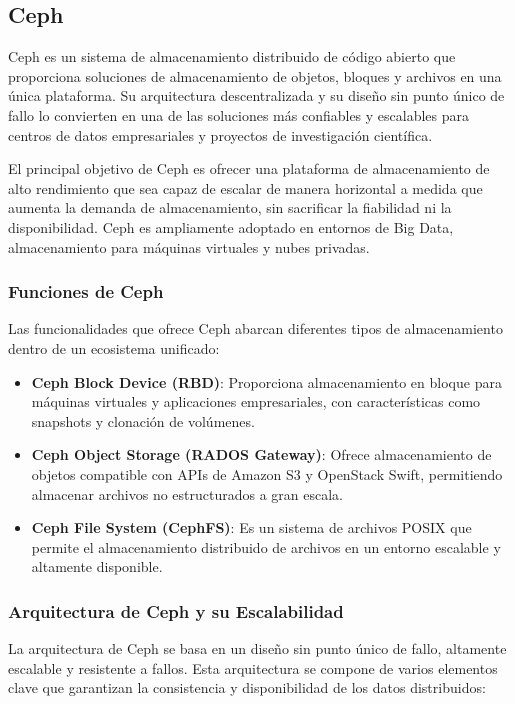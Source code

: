 {        \subsection{Ceph}
            Ceph es un sistema de almacenamiento distribuido de código abierto que proporciona soluciones de almacenamiento de objetos, bloques y archivos en una única plataforma. Su arquitectura descentralizada y su diseño sin punto único de fallo lo convierten en una de las soluciones más confiables y escalables para centros de datos empresariales y proyectos de investigación científica.
            
            El principal objetivo de Ceph es ofrecer una plataforma de almacenamiento de alto rendimiento que sea capaz de escalar de manera horizontal a medida que aumenta la demanda de almacenamiento, sin sacrificar la fiabilidad ni la disponibilidad. Ceph es ampliamente adoptado en entornos de Big Data, almacenamiento para máquinas virtuales y nubes privadas.
            
            \subsubsection{Funciones de Ceph}
                Las funcionalidades que ofrece Ceph abarcan diferentes tipos de almacenamiento dentro de un ecosistema unificado:
                
                \begin{itemize}
                    \item \textbf{Ceph Block Device (RBD)}: Proporciona almacenamiento en bloque para máquinas virtuales y aplicaciones empresariales, con características como snapshots y clonación de volúmenes.
                    \item \textbf{Ceph Object Storage (RADOS Gateway)}: Ofrece almacenamiento de objetos compatible con APIs de Amazon S3 y OpenStack Swift, permitiendo almacenar archivos no estructurados a gran escala.
                    \item \textbf{Ceph File System (CephFS)}: Es un sistema de archivos POSIX que permite el almacenamiento distribuido de archivos en un entorno escalable y altamente disponible.
                \end{itemize}
                
            \subsubsection{Arquitectura de Ceph y su Escalabilidad}
                La arquitectura de Ceph se basa en un diseño sin punto único de fallo, altamente escalable y resistente a fallos. Esta arquitectura se compone de varios elementos clave que garantizan la consistencia y disponibilidad de los datos distribuidos:
                
}
